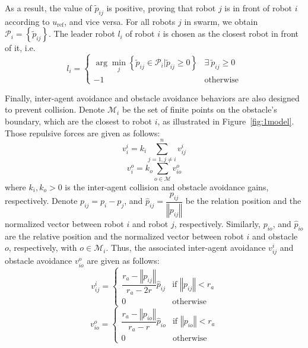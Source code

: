 As a result, the value of $\tilde{p}_{ij}$ is positive, proving that robot $j$ is in front of robot $i$ according to $u_\text{ref}$, and vice versa. For all robots $j$ in swarm, we obtain $\mathcal{P}_i=\left\{\tilde{p}_{ij}\right\}$. The leader robot ${l_i}$ of robot $i$ is chosen as the closest robot in front of it, i.e.
\begin{equation}
     l_i=\begin{cases}
    \arg\min_{j}\left\{\tilde{p}_{ij}\in\mathcal{P}_i\vert\tilde{p}_{ij}\geq0\right\} & \exists~\tilde{p}_{ij}\geq0\\ 
    -1 & \text{otherwise}
     \end{cases}
    \label{eqn:1li}
\end{equation}

Finally, inter-agent avoidance and obstacle avoidance behaviors are also designed to prevent collision. Denote $\mathcal{M}_i$ be the set of finite points on the obstacle's boundary, which are the closest to robot $i$, as illustrated in Figure~\ref{fig:1model}. Those repulsive forces are given as follows:
\begin{equation}
    v_i^i=k_{i}\sum_{j=1,j\neq i}^n{v_{ij}^i}
\end{equation}
\begin{equation}
    v_i^o=k_o\sum_{o\in\mathcal{M}}v_{io}^o
\end{equation}
where $k_i,k_o>0$ is the inter-agent collision and obstacle avoidance gains, respectively. Denote $p_{ij}=p_i-p_j$, and $\hat{p}_{ij}=\dfrac{p_{ij}}{\left\Vert p_{ij}\right\Vert}$ be the relation position and the normalized vector between robot $i$ and robot $j$, respectively. Similarly, $p_{io}$, and $\hat{p}_{io}$ are the relative position and the normalized vector between robot $i$ and obstacle $o$, respectively, with $o\in\mathcal{M}_i$. Thus, the associated inter-agent avoidance $v_{ij}^i$ and obstacle avoidance $v_{io}^o$ are given as follows:
\begin{equation}
    v_{ij}^{i}=\begin{cases}
    \dfrac{r_a-\left\Vert p_{ij}\right\Vert}{r_a -2r}\hat{p}_{ij} & \text{if }\left\Vert p_{ij}\right\Vert<r_{a} \\
    0 & \text{otherwise}
    \end{cases}
    \label{eqn:1ui}
\end{equation}
\begin{equation}
    v_{io}^{o}=\begin{cases}
    \dfrac{r_a-\left\Vert p_{io}\right\Vert}{r_a -r}\hat{p}_{io} & \text{if }\left\Vert p_{io}\right\Vert<r_{a} \\
    0 & \text{otherwise}
    \end{cases}
    \label{eqn:1uo}
\end{equation}

